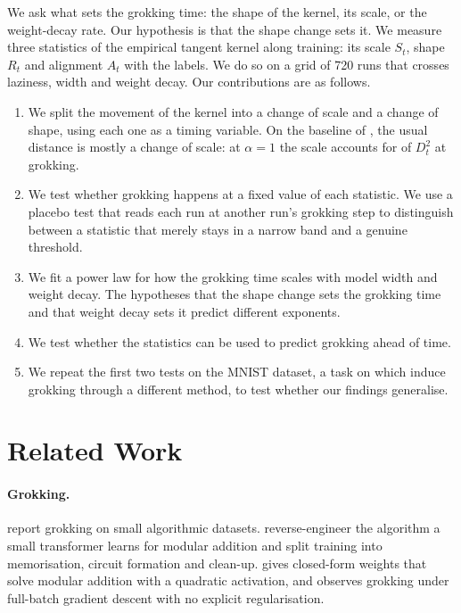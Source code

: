 \documentclass[a4paper,11pt]{article} %
\begin{document}
We ask what sets the grokking time: the shape of the kernel, its scale, or the
weight-decay rate. Our hypothesis is that the shape change sets it.
We measure three
statistics of the empirical tangent kernel along training: its scale $S_t$,
shape $R_t$ and alignment $A_t$ with the labels. We do so on a grid of
720 runs that crosses laziness, width and weight decay. Our contributions are as
follows.
\begin{enumerate}[1.]
  \item We split the movement of the kernel into a change of scale and a
    change of shape, using each one as a timing variable. On the baseline of
    \citet{kumarGrokkingTransitionLazy2024}, the usual distance is mostly a
    change of scale: at $\alpha=1$ the scale accounts for
    \NtwoAOneGrok{} of $D_t^2$
    at grokking.
  \item We test whether grokking happens at a fixed value of each statistic.
    We use a placebo test that reads each run at another run's grokking step to distinguish between a statistic that merely stays in a narrow band and a genuine threshold.
  \item We fit a power law for how the grokking time scales
    with model width and weight decay. The hypotheses that the shape change
    sets the grokking time and that weight decay sets it predict different
    exponents.
  \item We test whether the statistics can be used to predict
    grokking ahead of time.
  \item We repeat the first two tests on the MNIST dataset, a task on which
    \citet{liuOmnigrokGrokkingAlgorithmic2023} induce grokking
    through a different method,
    to test whether our findings generalise.
\end{enumerate}

\section{Related Work}\label{sec:related}

\paragraph{Grokking.}
\citet{powerGrokkingGeneralizationOverfitting2022} report grokking on small
algorithmic datasets. \citet{nandaProgressMeasuresGrokking2023} reverse-engineer
the algorithm a small transformer learns for modular addition and split training
into memorisation, circuit formation and clean-up.
\citet{gromovGrokkingModularArithmetic2023} gives closed-form weights that solve
modular addition with a quadratic activation, and observes grokking under
full-batch gradient descent with no explicit regularisation.
\end{document}
